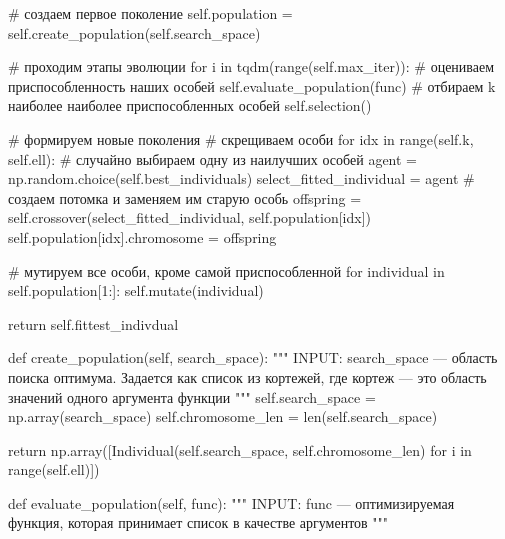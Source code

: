 \begin{pyprint}
    # создаем первое поколение
    self.population = self.create_population(self.search_space)

    # проходим этапы эволюции
    for i in tqdm(range(self.max_iter)):
       # оцениваем приспособленность наших особей
       self.evaluate_population(func)
       # отбираем k наиболее наиболее приспособленных особей
       self.selection()

       # формируем новые поколения
       # скрещиваем особи
       for idx in range(self.k, self.ell):
          # случайно выбираем одну из наилучших особей
          agent = np.random.choice(self.best_individuals)
          select_fitted_individual = agent
          # создаем потомка и заменяем им старую особь
          offspring = self.crossover(select_fitted_individual,
                                     self.population[idx])
          self.population[idx].chromosome = offspring

       # мутируем все особи, кроме самой приспособленной
       for individual in self.population[1:]:
          self.mutate(individual)

    return self.fittest_indivdual

  def create_population(self, search_space):
    """
    INPUT:
    search_space --- область поиска оптимума. Задается как список
    из кортежей, где кортеж --- это область значений одного
    аргумента функции
    """
		self.search_space = np.array(search_space)
    self.chromosome_len = len(self.search_space)

    return np.array([Individual(self.search_space, self.chromosome_len)
                    for i in range(self.ell)])

  def evaluate_population(self, func):
    """
    INPUT:
    func --- оптимизируемая функция, которая принимает список
    в качестве аргументов
    """
\end{pyprint}

